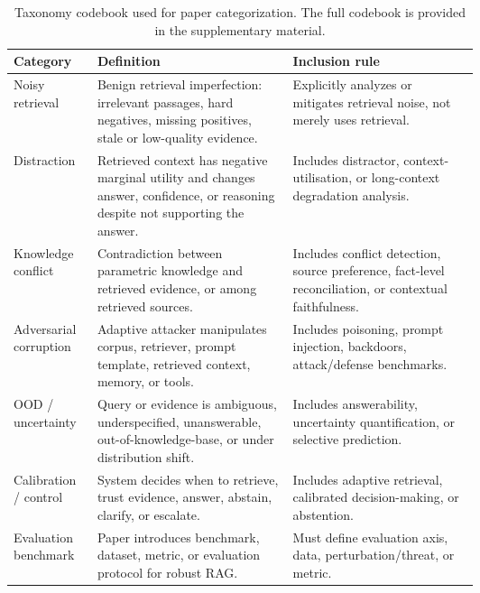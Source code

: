 \begin{table}[t]
\centering
\scriptsize
\begin{tabularx}{\linewidth}{p{0.18\linewidth}p{0.42\linewidth}X}
\toprule
\textbf{Category} & \textbf{Definition} & \textbf{Inclusion rule} \\
\midrule
Noisy retrieval & Benign retrieval imperfection: irrelevant passages, hard negatives, missing positives, stale or low-quality evidence. & Explicitly analyzes or mitigates retrieval noise, not merely uses retrieval. \\
Distraction & Retrieved context has negative marginal utility and changes answer, confidence, or reasoning despite not supporting the answer. & Includes distractor, context-utilisation, or long-context degradation analysis. \\
Knowledge conflict & Contradiction between parametric knowledge and retrieved evidence, or among retrieved sources. & Includes conflict detection, source preference, fact-level reconciliation, or contextual faithfulness. \\
Adversarial corruption & Adaptive attacker manipulates corpus, retriever, prompt template, retrieved context, memory, or tools. & Includes poisoning, prompt injection, backdoors, attack/defense benchmarks. \\
OOD / uncertainty & Query or evidence is ambiguous, underspecified, unanswerable, out-of-knowledge-base, or under distribution shift. & Includes answerability, uncertainty quantification, or selective prediction. \\
Calibration / control & System decides when to retrieve, trust evidence, answer, abstain, clarify, or escalate. & Includes adaptive retrieval, calibrated decision-making, or abstention. \\
Evaluation benchmark & Paper introduces benchmark, dataset, metric, or evaluation protocol for robust RAG. & Must define evaluation axis, data, perturbation/threat, or metric. \\
\bottomrule
\end{tabularx}
\caption{Taxonomy codebook used for paper categorization. The full codebook is provided in the supplementary material.}
\label{tab:codebook}
\end{table}
